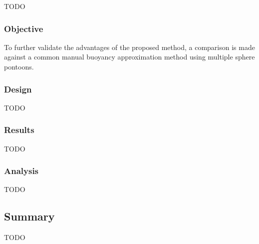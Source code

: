 {\LARGE\color{red}TODO}

\subsubsection*{Objective}
To further validate the advantages of the proposed method, a comparison is made against a common manual buoyancy approximation method using multiple sphere pontoons.

\subsubsection*{Design}

{\color{red}TODO}

\subsubsection*{Results}

{\color{red}TODO}

\subsubsection*{Analysis}

{\color{red}TODO}

\subsection*{Summary}

{\color{red}TODO}